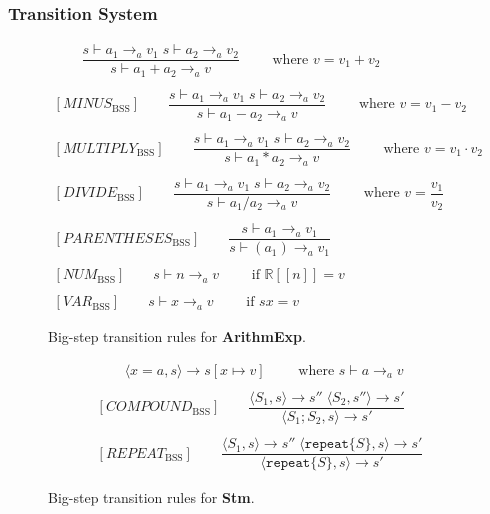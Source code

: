 \subsubsection*{Transition System}

\begin{figure}[htbp]
	\centering
	\begin{gather*}
		[PLUS_\text{BSS}] 
		\qquad \dfrac
		{s \vdash a_1 \rightarrow_a v_1 \; s \vdash a_2 \rightarrow_a v_2}
		{s \vdash a_1 + a_2 \rightarrow_a v}
		\qquad \text{ where }v = v_1 + v_2
		\\
		\\
		[MINUS_\text{BSS}] 
		\qquad \dfrac
		{s \vdash a_1 \rightarrow_a v_1 \; s \vdash a_2 \rightarrow_a v_2}
		{s \vdash a_1 - a_2 \rightarrow_a v}
		\qquad \text{ where }v = v_1 - v_2
		\\
		\\
		[MULTIPLY_\text{BSS}] 
		\qquad \dfrac
		{s \vdash a_1 \rightarrow_a v_1 \; s \vdash a_2 \rightarrow_a v_2}
		{s \vdash a_1 * a_2 \rightarrow_a v}
		\qquad \text{ where }v = v_1 \cdot v_2
		\\
		\\
		[DIVIDE_\text{BSS}] 
		\qquad \dfrac
		{s \vdash a_1 \rightarrow_a v_1 \; s \vdash a_2 \rightarrow_a v_2}
		{s \vdash a_1 / a_2 \rightarrow_a v}
		\qquad \text{ where }v = \dfrac{v_1}{v_2}
		\\
		\\
		[PARENTHESES_\text{BSS}] 
		\qquad \dfrac
		{s \vdash a_1 \rightarrow_a v_1}
		{s \vdash (a_1) \rightarrow_a v_1}
		\\
		\\
		[NUM_\text{BSS}] 
		\qquad s \vdash n \rightarrow_a v
		\qquad \text{ if } \mathbb{R}[\![n]\!] = v
		\\
		\\
		[VAR_\text{BSS}] 
		\qquad s \vdash x \rightarrow_a v
		\qquad \text{ if } sx = v
	\end{gather*}
	\caption{Big-step transition rules for \textbf{ArithmExp}.}
	\label{fig:BssArithm}
\end{figure}

\begin{figure}[htbp]
	\centering
	\begin{gather*}
		[ASSIGNMENT_\text{BSS}] 
		\qquad \langle x=a,s\rangle \rightarrow s[x\mapsto v]
		\qquad \text{ where }s\vdash a \rightarrow_a v
		\\
		\\
		[COMPOUND_\text{BSS}] 
		\qquad \dfrac
		{\langle S_1, s\rangle \rightarrow s'' \;\langle S_2, s''\rangle \rightarrow s'}
		{\langle S_1;S_2,s\rangle\rightarrow s'}
		\\
		\\
		[REPEAT_\text{BSS}] 
		\qquad \dfrac
		{\langle S_1, s\rangle \rightarrow s'' \;\langle \texttt{repeat} \{S\}, s\rangle \rightarrow s'}
		{\langle \texttt{repeat} \{S\}, s\rangle\rightarrow s'}
	\end{gather*}
	\caption{Big-step transition rules for \textbf{Stm}.}
	\label{fig:BssStm}
\end{figure}

